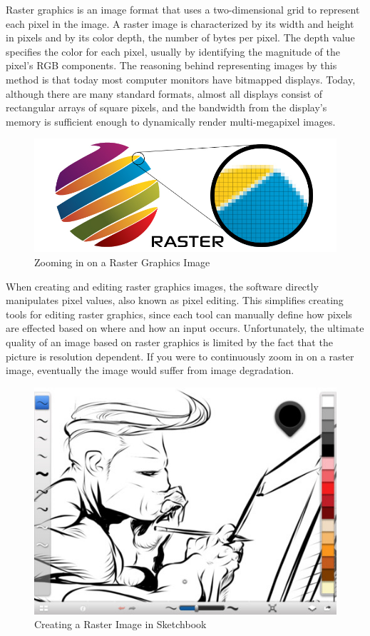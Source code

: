\documentclass[12pt]{report}
\begin{document}
Raster graphics is an image format that uses a two-dimensional grid to represent each pixel in the image. 
A raster image is characterized by its width and height in pixels and by its color depth, the number of bytes per pixel. 
The depth value specifies the color for each pixel, usually by identifying the magnitude of the pixel's RGB components. 
The reasoning behind representing images by this method is that today most computer monitors have bitmapped displays. 
Today, although there are many standard formats, almost all displays consist of rectangular arrays of square pixels, and the bandwidth from the display's memory is sufficient enough to dynamically render multi-megapixel images. 
\begin{figure}
\includegraphics[width=\textwidth]{raster.jpg}
\caption{Zooming in on a Raster Graphics Image}
\end{figure}



When creating and editing raster graphics images, the software directly manipulates pixel values, also known as pixel editing.
This simplifies creating tools for editing raster graphics, since each tool can manually define how pixels are effected based on where and how an input occurs. 
Unfortunately, the ultimate quality of an image based on raster graphics is limited by the fact that the picture is resolution dependent. 
If you were to continuously zoom in on a raster image, eventually the image would suffer from image degradation. 

\begin{figure}
\includegraphics[width=\textwidth]{sketchbook.jpg}
\caption{Creating a Raster Image in Sketchbook}
\end{figure}
\end{document}
